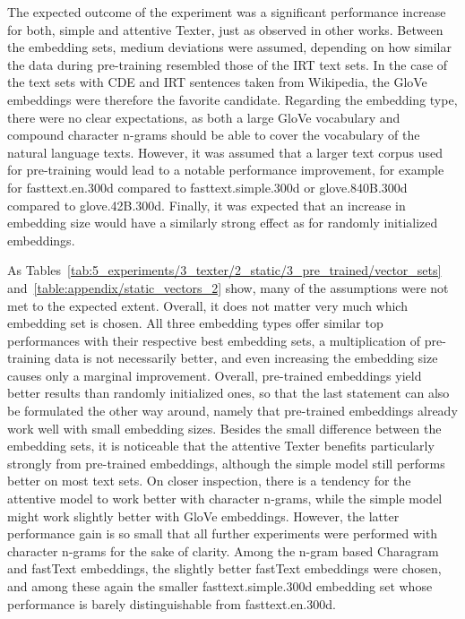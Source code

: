 The expected outcome of the experiment was a significant performance increase for both, simple and attentive Texter, just as observed in other works. Between the embedding sets, medium deviations were assumed, depending on how similar the data during pre-training resembled those of the IRT text sets. In the case of the text sets with CDE and IRT sentences taken from Wikipedia, the GloVe embeddings were therefore the favorite candidate. Regarding the embedding type, there were no clear expectations, as both a large GloVe vocabulary and compound character n-grams should be able to cover the vocabulary of the natural language texts. However, it was assumed that a larger text corpus used for pre-training would lead to a notable performance improvement, for example for fasttext.en.300d compared to fasttext.simple.300d or glove.840B.300d compared to glove.42B.300d. Finally, it was expected that an increase in embedding size would have a similarly strong effect as for randomly initialized embeddings.

As Tables~\ref{tab:5_experiments/3_texter/2_static/3_pre_trained/vector_sets} and~\ref{table:appendix/static_vectors_2} show, many of the assumptions were not met to the expected extent. Overall, it does not matter very much which embedding set is chosen. All three embedding types offer similar top performances with their respective best embedding sets, a multiplication of pre-training data is not necessarily better, and even increasing the embedding size causes only a marginal improvement. Overall, pre-trained embeddings yield better results than randomly initialized ones, so that the last statement can also be formulated the other way around, namely that pre-trained embeddings already work well with small embedding sizes. Besides the small difference between the embedding sets, it is noticeable that the attentive Texter benefits particularly strongly from pre-trained embeddings, although the simple model still performs better on most text sets. On closer inspection, there is a tendency for the attentive model to work better with character n-grams, while the simple model might work slightly better with GloVe embeddings. However, the latter performance gain is so small that all further experiments were performed with character n-grams for the sake of clarity. Among the n-gram based Charagram and fastText embeddings, the slightly better fastText embeddings were chosen, and among these again the smaller fasttext.simple.300d embedding set whose performance is barely distinguishable from fasttext.en.300d.
